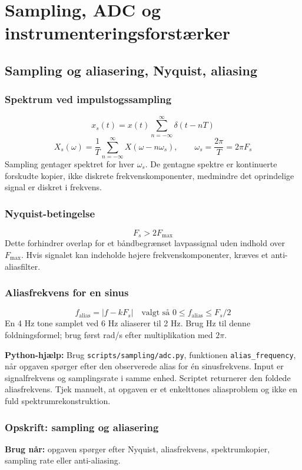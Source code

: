 \section{Sampling, ADC og instrumenteringsforstærker}

\subsection{Sampling og aliasering, Nyquist, aliasing}

\subsubsection{Spektrum ved impulstogssampling}
\[
x_s(t)=x(t)\sum_{n=-\infty}^{\infty}\delta(t-nT)
\]
\[
X_s(\omega)=\frac{1}{T}\sum_{n=-\infty}^{\infty}X(\omega-n\omega_s),\qquad
\omega_s=\frac{2\pi}{T}=2\pi F_s
\]
Sampling gentager spektret for hver \(\omega_s\). De gentagne spektre er kontinuerte forskudte kopier, ikke diskrete frekvenskomponenter, medmindre det oprindelige signal er diskret i frekvens.

\subsubsection{Nyquist-betingelse}
\[
F_s>2F_{\max}
\]
Dette forhindrer overlap for et båndbegrænset lavpassignal uden indhold over \(F_{\max}\). Hvis signalet kan indeholde højere frekvenskomponenter, kræves et anti-aliasfilter.

\subsubsection{Aliasfrekvens for en sinus}
\[
f_{\mathrm{alias}}=\left|f-kF_s\right|\quad\text{valgt så }0\leq f_{\mathrm{alias}}\leq F_s/2
\]
En 4 Hz tone samplet ved 6 Hz aliaserer til 2 Hz. Brug Hz til denne foldningsformel; brug først rad/s efter multiplikation med \(2\pi\).

\textbf{Python-hjælp:} Brug \texttt{scripts/sampling/adc.py}, funktionen \texttt{alias\_frequency}, når opgaven spørger efter den observerede alias for én sinusfrekvens. Input er signalfrekvens og samplingsrate i samme enhed. Scriptet returnerer den foldede aliasfrekvens. Tjek manuelt, at opgaven er et enkelttones aliasproblem og ikke en fuld spektrumrekonstruktion.

\subsubsection{Opskrift: sampling og aliasering}
\textbf{Brug når:} opgaven spørger efter Nyquist, aliasfrekvens, spektrumkopier, sampling rate eller anti-aliasing.

